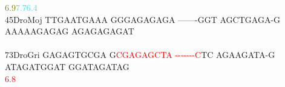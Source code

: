 \documentclass[11pt,twoside,reqno,a4paper]{article}
\begin{document}
{\hspace*{4\charwidth}\hspace*{7\charwidth}\hspace*{6\charwidth}\textcolor{olive}{6.9}\hspace*{1\charwidth}\hspace*{1\charwidth}\hspace*{18\charwidth}\textcolor{cyan}{7.7}\hspace*{1\charwidth}\hspace*{1\charwidth}\hspace*{1\charwidth}\hspace*{24\charwidth}\textcolor{cyan}{6.4}\hspace*{1\charwidth}\\
45\hspace*{2\charwidth}DroMoj	TTGAATGAAA	GGGAGAGAGA	-------GGT	AGCTGAGA-G	AAAAAGAGAG	AGAGAGAGAT	\\
\hspace*{4\charwidth}\hspace*{7\charwidth}\hspace*{1\charwidth}\hspace*{1\charwidth}\hspace*{1\charwidth}\hspace*{1\charwidth}\hspace*{1\charwidth}\hspace*{1\charwidth}\\
73\hspace*{2\charwidth}DroGri	GAGAGTGCGA	G\textcolor{red}{C}\textcolor{red}{G}\textcolor{red}{A}\textcolor{red}{G}\textcolor{red}{A}\textcolor{red}{G}\textcolor{red}{C}\textcolor{red}{T}\textcolor{red}{A}	\textcolor{red}{-}\textcolor{red}{-}\textcolor{red}{-}\textcolor{red}{-}\textcolor{red}{-}\textcolor{red}{-}\textcolor{red}{-}\textcolor{red}{C}TC	AGAAGATA-G	ATAGATGGAT	GGATAGATAG	\\
\hspace*{4\charwidth}\hspace*{7\charwidth}\hspace*{1\charwidth}\hspace*{11\charwidth}\textcolor{red}{6.8}\hspace*{1\charwidth}\hspace*{1\charwidth}\hspace*{1\charwidth}\hspace*{1\charwidth}\hspace*{1\charwidth}\\
\\
}
\end{document}
